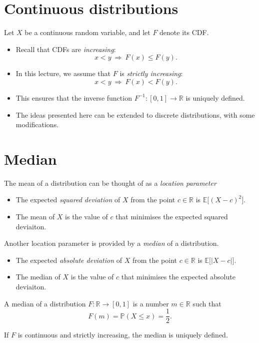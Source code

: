 \documentclass[lecture]{csm}
\newcommand{\prob}{\mathbb{P}}
\newcommand{\expe}{\mathbb{E}}
\newcommand{\R}{\mathbb{R}}
\def\it{\item}
\def\bit{\begin{itemize}}
\def\eit{\end{itemize}}
\begin{document}
\maketitle
\tableofcontents


\newpage
\section{Continuous distributions}
Let $X$ be a continuous random variable, and let $F$ denote its CDF.
\bit
\it Recall that CDFs are \emph{increasing}: $$x<y \ \Rightarrow\ F(x)\leq F(y).$$
\it In this lecture, we assume that $F$ is \emph{strictly increasing}: $$x<y \ \Rightarrow\ F(x)<F(y).$$
\it This ensures that the inverse function $F^{-1}:[0,1]\to\R$ is uniquely defined.
\it The ideas presented here can be extended to discrete distributions, with some modifications.
\eit

\newpage
\section{Median}
The mean of a distribution can be thought of as a \emph{location parameter}
\bit
\it The expected \emph{squared deviation} of $X$ from the point $c\in\R$ is $\expe\big[(X-c)^2\big]$.
\it The mean of $X$ is the value of $c$ that minimises the expected squared deviaiton. 
\eit

\vspace{2ex}
Another location parameter is provided by a \emph{median} of a distribution.
\bit
\it The expected \emph{absolute deviation} of $X$ from the point $c\in\R$ is $\expe\big[|X-c|\big]$.
\it The median of $X$ is the value of $c$ that minimises the expected absolute deviaiton. 
\eit

\begin{definition}
A median of a distribution $F:\R\to[0,1]$ is a number $m\in\R$ such that 
\[
\displaystyle F(m)=\prob(X\leq x) = \frac{1}{2}.
\] 
\end{definition}

\begin{remark}
If $F$ is continuous and strictly increasing, the median is uniquely defined.
\end{remark}
\end{document}
